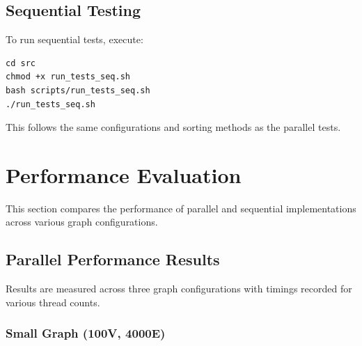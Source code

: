 \documentclass[11pt]{article}
\begin{document}
\subsection{Sequential Testing}
To run sequential tests, execute:
\begin{lstlisting}
cd src
chmod +x run_tests_seq.sh
bash scripts/run_tests_seq.sh
./run_tests_seq.sh
\end{lstlisting}
This follows the same configurations and sorting methods as the parallel tests.

\section{Performance Evaluation}
This section compares the performance of parallel and sequential implementations across various graph configurations.

\subsection{Parallel Performance Results}
Results are measured across three graph configurations with timings recorded for various thread counts.

\subsubsection*{Small Graph (100V, 4000E)}
\begin{table}[H]
    \centering
    \caption{Parallel performance for Small Graph (100V, 4000E). Speedup is computed as the (time with 1 thread)/(best time across threads).}
    \label{tab:small_parallel}
\end{table}
\end{document}
